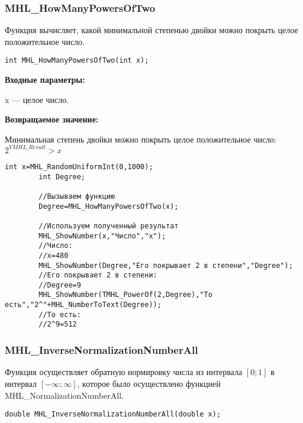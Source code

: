 \documentclass[a4paper,12pt]{article}
\begin{document}
\subsubsection{MHL\_HowManyPowersOfTwo}\label{MHL_HowManyPowersOfTwo}

Функция вычисляет, какой минимальной степенью двойки можно покрыть целое положительное число.


\begin{lstlisting}[label=code_syntax_MHL_HowManyPowersOfTwo,caption=Синтаксис]
int MHL_HowManyPowersOfTwo(int x);
\end{lstlisting}

\textbf{Входные параметры:}  
 
x --- целое число.

\textbf{Возвращаемое значение:}
 
 Минимальная степень двойки можно покрыть целое положительное число: $2^{VMHL\_Result}>x$


\begin{lstlisting}[label=code_use_MHL_HowManyPowersOfTwo,caption=Пример использования]
        int x=MHL_RandomUniformInt(0,1000);
        int Degree;

        //Вызываем функцию
        Degree=MHL_HowManyPowersOfTwo(x);

        //Используем полученный результат
        MHL_ShowNumber(x,"Число","x");
        //Число:
        //x=480
        MHL_ShowNumber(Degree,"Его покрывает 2 в степени","Degree");
        //Его покрывает 2 в степени:
        //Degree=9
        MHL_ShowNumber(TMHL_PowerOf(2,Degree),"То есть","2^"+MHL_NumberToText(Degree));
        //То есть:
        //2^9=512
\end{lstlisting}

\subsubsection{MHL\_InverseNormalizationNumberAll}\label{MHL_InverseNormalizationNumberAll}

Функция осуществляет обратную нормировку числа из интервала $\left[0;1\right] $  в интервал $\left[-\infty;\infty \right] $, которое было осуществлено функцией MHL\_NormalizationNumberAll.


\begin{lstlisting}[label=code_syntax_MHL_InverseNormalizationNumberAll,caption=Синтаксис]
double MHL_InverseNormalizationNumberAll(double x);
\end{lstlisting}
\end{document}
